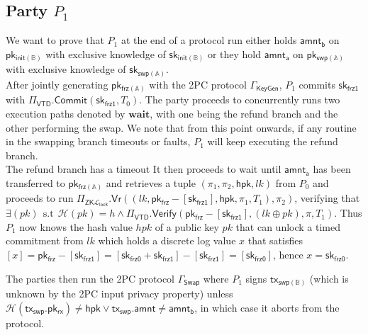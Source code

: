 \documentclass{article}      	%
\begin{document}
\subsection{Party $P_1$}
We want to prove that $P_1$ at the end of a protocol run either holds $\mathsf{amnt_b}$ on $\mathsf{pk_{init(\mathbb{B})}}$ with exclusive knowledge of $\mathsf{sk_{init(\mathbb{B})}}$ or they hold $\mathsf{amnt_a}$ on $\mathsf{pk_{swp(\mathbb{A})}}$ with exclusive knowledge of $\mathsf{sk_{swp(\mathbb{A})}}$. \\

After jointly generating $\mathsf{pk_{frz(\mathbb{A})}}$ with the 2PC protocol $\Gamma_{\mathsf{KeyGen}}$, $P_1$ commits $\mathsf{sk_{frz1}}$ with $\Pi_{\mathsf{VTD}}.\mathsf{Commit}(\mathsf{sk_{frz1}}, T_0)$. 
The party proceeds to concurrently runs two execution paths denoted by $\textbf{wait}$, with one being the refund branch and the other performing the swap. We note that from this point onwards, if any routine in the swapping branch timeouts or faults, $P_1$ will keep executing the refund branch. \\

The refund branch has a timeout 
It then proceeds to wait until $\mathsf{amnt_a}$ has been transferred to $\mathsf{pk_{frz(\mathbb{A})}}$ and retrieves a tuple $(\pi_1, \pi_2, \mathsf{hpk}, lk)$ from $P_0$ and proceeds to run $\Pi_{\mathsf{ZK}\mathcal{L}_{\mathsf{lock}}}.\mathsf{Vr}((lk, \mathsf{pk_{frz}} - [\mathsf{sk_{frz1}}], \mathsf{hpk}, \pi_1, T_1), \pi_2)$, verifying that $\exists(pk) \:\: \text{s.t} \:\: \mathcal{H}(pk) = h \land \Pi_\mathsf{VTD}.\mathsf{Verify}(\mathsf{pk_{frz}} - [\mathsf{sk_{frz1}}], (lk \oplus pk), \pi, T_1)$. Thus $P_1$ now knows the hash value $hpk$ of a public key $pk$ that can unlock a timed commitment from $lk$ which holds a discrete log value $x$ that satisfies  $[x] = \mathsf{pk_{frz}} - [\mathsf{sk_{frz1}}] = [\mathsf{sk_{frz0}} + \mathsf{sk_{frz1}}] - [\mathsf{sk_{frz1}}] = [\mathsf{sk_{frz0}}]$, hence $x = \mathsf{sk_{frz0}}$.

The parties then run the 2PC protocol $\Gamma_{\mathsf{Swap}}$ where $P_1$ signs $\mathsf{tx_{swp(\mathbb{B})}}$ (which is unknown by the 2PC input privacy property) unless $\mathcal{H}(\mathsf{tx_{swp}}.\mathsf{pk_{rx}}) \neq \mathsf{hpk} \lor  \mathsf{tx_{swp}}.\mathsf{amnt} \neq \mathsf{amnt_b}$, in which case it aborts from the protocol. \\
\end{document}
